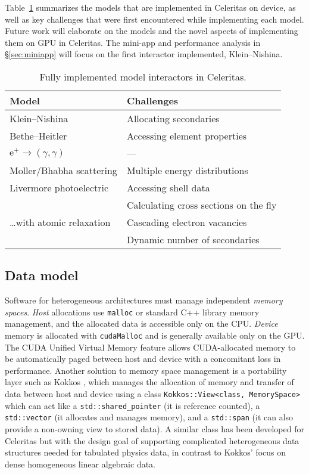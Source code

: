 Table~\ref{tab:interactor} summarizes the models that are implemented in
Celeritas on device, as well as key challenges that were first encountered while
implementing each model. Future work will elaborate on the models and the novel
aspects of implementing them on GPU in Celeritas.
The mini-app and performance analysis in \S\ref{sec:miniapp} will focus on the
first interactor implemented, Klein--Nishina.

\begin{table}[htb]
  \centering
  \begin{tabular}{ll}
    \toprule %
    Model & Challenges \\
    \midrule %
    Klein--Nishina & Allocating secondaries \\
    Bethe--Heitler & Accessing element properties \\
    \(\textrm{e}^+ \to (\gamma, \gamma)\) & --- \\
    Moller/Bhabha scattering & Multiple energy distributions \\
    Livermore photoelectric & Accessing shell data \\
                            & Calculating cross sections on the fly \\
    \dots with atomic relaxation & Cascading electron vacancies \\
                                 & Dynamic number of secondaries \\
    \bottomrule %
  \end{tabular}
  \caption{Fully implemented model interactors in Celeritas.}
  \label{tab:interactor}
\end{table}

\subsection{Data model}\label{data-model}

Software for heterogeneous architectures must manage independent
\emph{memory spaces}. \emph{Host} allocations use \texttt{malloc} or
standard C++ library memory management, and the allocated data is
accessible only on the CPU. \emph{Device} memory is allocated with
\texttt{cudaMalloc} and is generally available only on the GPU. The CUDA
Unified Virtual Memory feature allows CUDA-allocated memory to be
automatically paged between host and device with a concomitant loss in
performance. Another solution to memory space management is a
portability layer such as Kokkos \cite{kokkos}, which manages the
allocation of memory and transfer of data between host and device using
a class
\texttt{Kokkos::View\textless{}class,\ MemorySpace\textgreater{}} which
can act like a \texttt{std::shared\_pointer} (it is reference counted),
a \texttt{std::vector} (it allocates and manages memory), and a
\texttt{std::span} (it can also provide a non-owning view to stored
data). A similar class has been developed for Celeritas but with the
design goal of supporting complicated heterogeneous data structures needed for
tabulated physics data, in contrast to Kokkos' focus on dense homogeneous linear
algebraic data.

